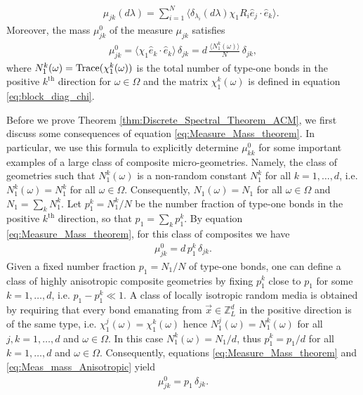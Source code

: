 \documentclass{cmslatex}
\begin{document}
\begin{theorem}
\begin{align}
  &&\mu_{jk}(d\lambda)=\sum_{i=1}^N\langle \delta_{\lambda_i}(d\lambda)\chi_1R_i\hat{e}_j\cdot\hat{e}_k\rangle.  
\end{align}
%
Moreover, the mass $\mu_{jk}^0$ of the measure $\mu_{jk}$ satisfies
%
\begin{align}\label{eq:Measure_Mass_theorem}
  \mu_{jk}^0=\langle\chi_1\hat{e}_k\cdot\hat{e}_k\rangle\,\delta_{jk}=d\,\frac{\langle N_1^k(\omega)\rangle}{N}\,\delta_{jk},
\end{align}
%
where $N_1^k(\omega)={\rm Trace}(\chi_1^k(\omega))$ is the total number of type-one
bonds in the positive $k^{\text{th}}$ direction for $\omega\in\Omega$ and the
matrix $\chi_1^k(\omega)$ is defined in equation \eqref{eq:block_diag_chi}. 
% 
\end{theorem}

Before we prove Theorem \ref{thm:Discrete_Spectral_Theorem_ACM}, we
first discuss some consequences of equation
\eqref{eq:Measure_Mass_theorem}. In particular, we use this
formula to explicitly determine $\mu^0_{kk}$ for some important
examples of a large class of composite micro-geometries. Namely, the
class of geometries such that $N_1^k(\omega)$ is a non-random constant
$N_1^k$ for all $k=1,\ldots,d$, i.e. $N_1^k(\omega)=N_1^k$ for all
$\omega\in\Omega$. Consequently, $N_1(\omega)=N_1$ for all $\omega\in\Omega$ and
$N_1=\sum_kN_1^k$. Let $p_1^k=N_1^k/N$ be the number fraction of type-one
bonds in the positive $k^{\text{th}}$ direction, so that
$p_1=\sum_kp_1^k$. By equation \eqref{eq:Measure_Mass_theorem}, for this
class of composites we have
% 
\begin{align}\label{eq:Meas_mass_Anisotropic}
  \mu_{jk}^0=d\,p_1^k\,\delta_{jk}.
\end{align}
%
Given a fixed number fraction $p_1=N_1/N$ of type-one bonds, one can
define a class of highly anisotropic composite geometries by fixing
$p_1^k$ close to $p_1$ for some $k=1,\ldots,d$,
i.e. $p_1-p_1^k\ll1$. A class of locally isotropic random media is
obtained by requiring that every bond emanating from
$\vec{x}\in\mathbb{Z}^d_L$ in the positive direction is of the same
type, i.e. $\chi_1^j(\omega)=\chi_1^k(\omega)$ hence $N_1^j(\omega)=N_1^k(\omega)$ for all
$j,k=1,\ldots,d$ and $\omega\in\Omega$. In this case $N_1^k(\omega)=N_1/d$, thus
$p_1^k=p_1/d$ for all $k=1,\ldots,d$ and $\omega\in\Omega$. Consequently, equations
\eqref{eq:Measure_Mass_theorem} and \eqref{eq:Meas_mass_Anisotropic}
yield 
%
\begin{align}\label{eq:Meas_mass_Isotropic_iid}
  \mu_{jk}^0=p_1\,\delta_{jk}.
\end{align}
\end{document}
